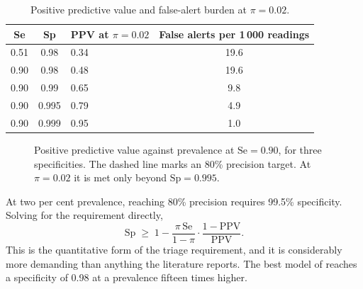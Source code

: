 \documentclass[12pt,a4paper,oneside]{report}
\begin{document}
\begin{table}[htbp]
\centering\small
\caption{Positive predictive value and false-alert burden at $\pi = 0.02$.}\label{tab:ppv}
\begin{tabularx}{\textwidth}{@{}c c X c@{}}
\toprule
\textbf{Se} & \textbf{Sp} & \textbf{PPV at $\pi = 0.02$} & \textbf{False alerts per 1\,000 readings} \\
\midrule
0.51 & 0.98 & 0.34 & 19.6 \\
0.90 & 0.98 & 0.48 & 19.6 \\
0.90 & 0.99 & 0.65 & 9.8 \\
0.90 & 0.995 & 0.79 & 4.9 \\
0.90 & 0.999 & 0.95 & 1.0 \\
\bottomrule
\end{tabularx}
\end{table}

\begin{figure}[htbp]
\centering
{}
\caption{Positive predictive value against prevalence at $\mathrm{Se}=0.90$, for three specificities. The dashed line marks an 80\% precision target. At $\pi=0.02$ it is met only beyond $\mathrm{Sp}=0.995$.}\label{fig:ppv-prevalence}
\end{figure}

At two per cent prevalence, reaching 80\% precision requires 99.5\% specificity. Solving for the requirement directly,
\begin{equation}
  \mathrm{Sp} \;\geq\; 1 - \frac{\pi\,\mathrm{Se}}{1-\pi}\cdot\frac{1-\mathrm{PPV}}{\mathrm{PPV}}.
\end{equation}
This is the quantitative form of the triage requirement, and it is considerably more demanding than anything the literature reports. The best model of \textcite{mendoza2025} reaches a specificity of 0.98 at a prevalence fifteen times higher.
\end{document}
